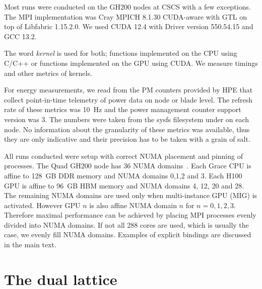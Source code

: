 Most runs were conducted on the GH200 nodes at CSCS with a few exceptions.
The MPI implementation was Cray MPICH 8.1.30 CUDA-aware with GTL on top of Libfabric 1.15.2.0.
We used CUDA 12.4 with Driver version 550.54.15 and GCC 13.2.

The word \emph{kernel} is used for both; functions implemented on the CPU using C/C++ or functions implemented on the GPU using CUDA.
We measure timings and other metrics of kernels.

For energy measurements, we read from the PM counters provided by HPE that collect point-in-time telemetry of power data on node or blade level.
The refresh rate of these metrics was \SI{10}{\hertz} and the power management counter support version was \num{3}.
The numbers were taken from the sysfs filesystem under  on each node.
No information about the granularity of these metrics was available, thus they are only indicative and their precision has to be taken with a grain of salt.

All runs conducted were setup with correct NUMA placement and pinning of processes.
The Quad GH200 node has \num{36} NUMA domains~\cite{fusco2024}.
Each Grace CPU is affine to \SI{128}{GB} DDR memory and NUMA domains \num{0},\num{1},\num{2} and \num{3}.
Each H100 GPU is affine to \SI{96}{GB} HBM memory and NUMA domains \num{4}, \num{12}, \num{20} and \num{28}.
The remaining NUMA domains are used only when multi-instance GPU (MIG) is activated.
However GPU $n$ is also affine NUMA domain $n$ for $n=0,1,2,3$.
Therefore maximal performance can be achieved by placing MPI processes evenly divided into NUMA domains.
If not all \num{288} cores are used, which is usually the case, we evenly fill NUMA domains.
Examples of explicit bindings are discussed in the main text.

\section{The dual lattice}
\label{sec:perf:dual}

